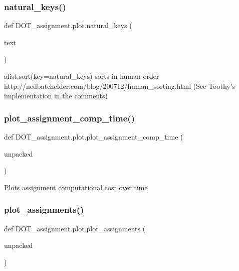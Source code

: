 \subsubsection{\texorpdfstring{natural\_keys()}{natural\_keys()}}
{\footnotesize\ttfamily def D\+O\+T\+\_\+assignment.\+plot.\+natural\+\_\+keys (\begin{DoxyParamCaption}\item[{}]{text }\end{DoxyParamCaption})}

\begin{DoxyVerb}alist.sort(key=natural_keys) sorts in human order
http://nedbatchelder.com/blog/200712/human_sorting.html
(See Toothy's implementation in the comments)
\end{DoxyVerb}
 \mbox{\label{namespace_d_o_t__assignment_1_1plot_a41c48deaad4aadf9bac59a450318d1e5}} 
\subsubsection{\texorpdfstring{plot\_assignment\_comp\_time()}{plot\_assignment\_comp\_time()}}
{\footnotesize\ttfamily def D\+O\+T\+\_\+assignment.\+plot.\+plot\+\_\+assignment\+\_\+comp\+\_\+time (\begin{DoxyParamCaption}\item[{}]{unpacked }\end{DoxyParamCaption})}

\begin{DoxyVerb}Plots assignment computational cost over time
\end{DoxyVerb}
 \mbox{\label{namespace_d_o_t__assignment_1_1plot_ad31101e31b7291d4b6504ad2fe1c8a33}} 
\subsubsection{\texorpdfstring{plot\_assignments()}{plot\_assignments()}}
{\footnotesize\ttfamily def D\+O\+T\+\_\+assignment.\+plot.\+plot\+\_\+assignments (\begin{DoxyParamCaption}\item[{}]{unpacked }\end{DoxyParamCaption})}

